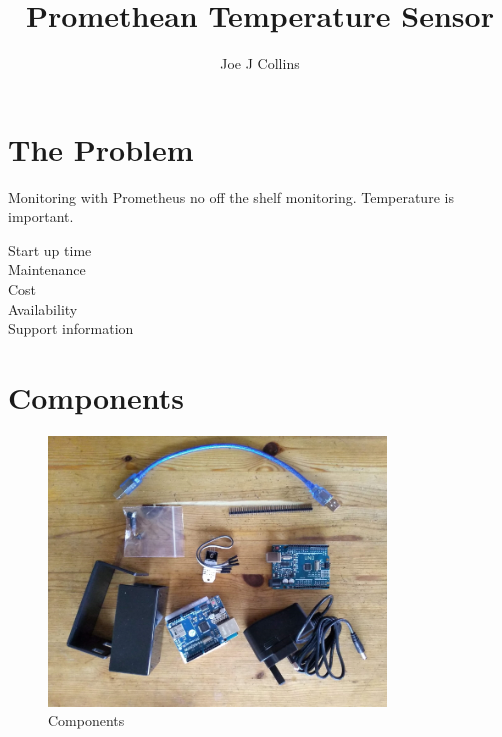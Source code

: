 \documentclass[a4paper, 12pt]{article}
\title{Promethean Temperature Sensor}
\author{Joe J Collins}
\begin{document}
\maketitle
\tableofcontents


\section{The Problem}

Monitoring with Prometheus
no off the shelf monitoring.
Temperature is important.

\begin{description}
  \item[Start up time]
  \item[Maintenance]
  \item[Cost]
  \item[Availability]
  \item[Support information] 
\end{description}


\section{Components}



\begin{figure}[H]
  \centering
  \includegraphics[width=0.8\textwidth]{components.jpg}
  \caption{Components}
\end{figure}

\end{document}
